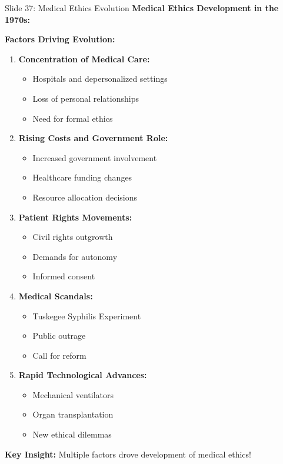 \documentclass[8pt]{beamer}
\begin{document}
	\begin{frame}{Slide 37: Medical Ethics Evolution}
		\fontsize{6.5}{7.5}\selectfont
		\textbf{Medical Ethics Development in the 1970s:}
		
		\vspace{0.1cm}
		\textbf{Factors Driving Evolution:}
		\begin{enumerate}
			\item \textbf{Concentration of Medical Care:}
			\begin{itemize}
				\item Hospitals and depersonalized settings
				\item Loss of personal relationships
				\item Need for formal ethics
			\end{itemize}
			\item \textbf{Rising Costs and Government Role:}
			\begin{itemize}
				\item Increased government involvement
				\item Healthcare funding changes
				\item Resource allocation decisions
			\end{itemize}
			\item \textbf{Patient Rights Movements:}
			\begin{itemize}
				\item Civil rights outgrowth
				\item Demands for autonomy
				\item Informed consent
			\end{itemize}
			\item \textbf{Medical Scandals:}
			\begin{itemize}
				\item Tuskegee Syphilis Experiment
				\item Public outrage
				\item Call for reform
			\end{itemize}
			\item \textbf{Rapid Technological Advances:}
			\begin{itemize}
				\item Mechanical ventilators
				\item Organ transplantation
				\item New ethical dilemmas
			\end{itemize}
		\end{enumerate}
		
		\textcolor{myblue}{\textbf{Key Insight:}} Multiple factors drove \textcolor{myblue}{development of medical ethics}!
	\end{frame}
	
\end{document}
